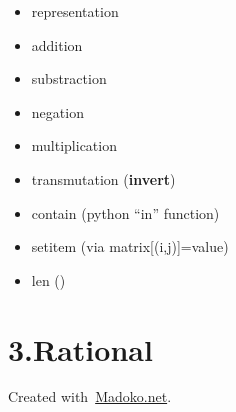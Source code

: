\documentclass[10pt]{article}
\begin{document}
\begin{itemize}[noitemsep,topsep=\mdcompacttopsep]%

\item{}representation%

\item{}addition%

\item{}substraction%

\item{}negation%

\item{}multiplication%

\item{}transmutation (\textbf{invert})%

\item{}contain (python \textquotedblleft{}in\textquotedblright{} function)%

\item{}setitem (via matrix[(i,j)]=value)%

\item{}len ()%
\end{itemize}%

\section{3.\hspace*{0.5em}Rational}\label{sec-ratio}%

\begin{mdbmargintb}{4em}{}%
\begin{mdflushright}%
{\tiny{}Created with~\href{https://www.madoko.net}{Madoko.net}.}%
\end{mdflushright}%
\end{mdbmargintb}%
\end{document}
